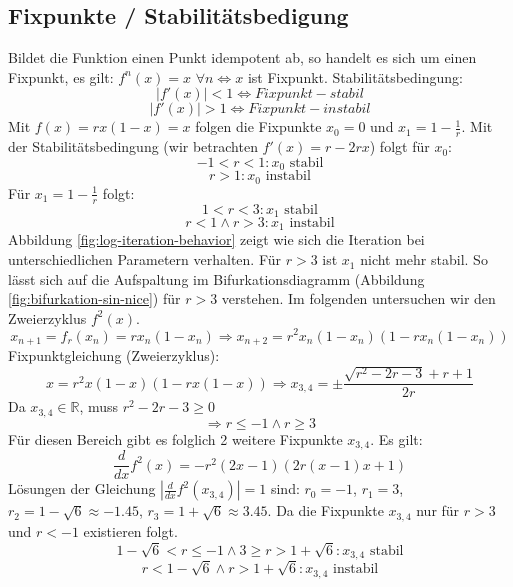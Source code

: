 \documentclass{scrartcl}
\begin{document}
\subsection{Fixpunkte / Stabilitätsbedigung}
Bildet die Funktion einen Punkt idempotent ab, so handelt es sich um einen Fixpunkt, es gilt: $f^n(x)=x$ $\forall n \iff x$ ist Fixpunkt. 
Stabilitätsbedingung:
\begin{equation} |f'(x)|<1 \iff Fixpunkt-stabil \end{equation}
\begin{equation} |f'(x)|>1 \iff Fixpunkt-instabil \end{equation}
Mit $ f(x)=rx(1-x)=x $ folgen die Fixpunkte $x_{0}=0$ und $x_{1}=1-\frac{1}{r}$. Mit der Stabilitätsbedingung (wir betrachten $f'(x)=r-2rx$) folgt für $x_{0}$:
$$-1 < r < 1: x_{0} \text{ stabil}$$
$$r > 1: x_{0} \text{ instabil}$$
Für $x_{1}=1-\frac{1}{r}$ folgt:
$$1 < r < 3: x_1 \text{ stabil}$$
$$r<1 \wedge  r> 3: x_1 \text{ instabil}$$
Abbildung \ref{fig:log-iteration-behavior} zeigt wie sich die Iteration bei unterschiedlichen Parametern verhalten. Für $r>3$ ist $x_1$ nicht mehr stabil. So lässt sich auf die Aufspaltung im Bifurkationsdiagramm (Abbildung \ref{fig:bifurkation-sin-nice}) für $r>3$ verstehen.  
Im folgenden untersuchen wir den Zweierzyklus $f^2(x)$.
\begin{equation}x_{n+1}=f_r(x_n)=rx_n(1-x_n)
\Rightarrow x_{n+2}=r^2x_n(1-x_n)(1-rx_n(1-x_n))\end{equation}
\newline
Fixpunktgleichung (Zweierzyklus):
\begin{equation}
x=r^2x(1-x)(1-rx(1-x))
\Rightarrow 
x_{3,4}=\pm\frac{\sqrt{r^2-2 r-3}+r+1}{2 r}
\end{equation}
Da $x_{3,4} \in \mathbb{R} $,  muss $r^2-2 r-3 \geq 0$
\begin{equation}
\Rightarrow r \leq -1 \land r \geq 3
\end{equation}
Für diesen Bereich gibt es folglich 2 weitere Fixpunkte $x_{3,4}$. 
Es gilt:
\begin{equation}
\frac{d}{dx}f^2(x)=-r^2(2x-1)(2r(x-1)x+1)
\end{equation}
Lösungen der Gleichung $|\frac{d}{dx}f^2(x_{3,4})|=1$ sind: $r_0=-1$, $r_1=3$, $r_2=1-\sqrt{6}\approx-1.45$, $r_3=1+\sqrt{6}\approx3.45$. Da die Fixpunkte $x_{3,4}$ nur für $r>3$ und $r<-1$ existieren folgt.
\begin{equation}1-\sqrt{6}< r \leq -1 \wedge 3 \geq r > 1+\sqrt{6}: x_{3,4} \text{ stabil}
\end{equation}
\begin{equation}r < 1-\sqrt{6} \wedge r>1+\sqrt{6}: x_{3,4} \text{ instabil}
\end{equation}
\end{document}
